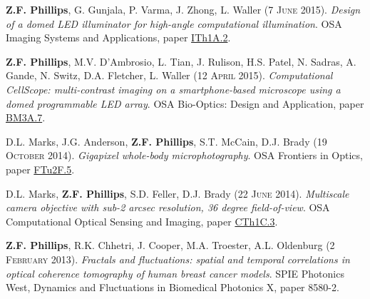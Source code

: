 \documentclass[12pt,letterpaper]{article}
\renewcommand{\date}[1]{#1}
\begin{document}
\medskip
\textbf{Z.F. Phillips}, G. Gunjala, P. Varma, J. Zhong, L. Waller (\date{7 \textsc{June} 2015}). \emph{Design of a domed LED illuminator for high-angle computational illumination}. OSA Imaging Systems and Applications, paper \href{https://doi.org/10.1364/ISA.2015.ITh1A.2}{ITh1A.2}.

\medskip
\textbf{Z.F. Phillips}, M.V. D'Ambrosio, L. Tian, J. Rulison, H.S. Patel, N. Sadras, A. Gande, N. Switz, D.A. Fletcher, L. Waller (\date{12 \textsc{April} 2015}). \emph{Computational CellScope: multi-contrast imaging on a smartphone-based microscope using a domed programmable LED array}. OSA Bio-Optics: Design and Application, paper \href{https://doi.org/10.1364/BODA.2015.BM3A.7}{BM3A.7}.

\medskip
D.L. Marks, J.G. Anderson, \textbf{Z.F. Phillips}, S.T. McCain, D.J. Brady (\date{19 \textsc{October} 2014}). \emph{Gigapixel whole-body microphotography}. OSA Frontiers in Optics, paper \href{https://doi.org/10.1364/FIO.2014.FTu2F.5}{FTu2F.5}.

\medskip
D.L. Marks, \textbf{Z.F. Phillips}, S.D. Feller, D.J. Brady (\date{22 \textsc{June} 2014}). \emph{Multiscale camera objective with sub-2 arcsec resolution, 36 degree field-of-view}. OSA Computational Optical Sensing and Imaging, paper \href{https://doi.org/10.1364/COSI.2014.CTh1C.3}{CTh1C.3}.

\medskip
\textbf{Z.F. Phillips}, R.K. Chhetri, J. Cooper, M.A. Troester, A.L. Oldenburg (\date{2 \textsc{February} 2013}). \emph{Fractals and fluctuations: spatial and temporal correlations in optical coherence tomography of human breast cancer models}. SPIE Photonics West, Dynamics and Fluctuations in Biomedical Photonics X, paper 8580-2.
\end{document}

